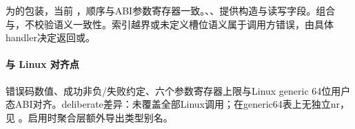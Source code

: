 为的包装，当前 ，顺序与ABI参数寄存器一致。、、提供构造与读写字段。组合与，不校验语义一致性。索引越界或未定义槽位语义属于调用方错误，由具体handler决定返回或。

\paragraph{与 Linux 对齐点}

错误码数值、成功非负/失败约定、六个参数寄存器上限与Linux generic 64位用户态ABI对齐。deliberate差异：未覆盖全部Linux调用；在generic64表上无独立nr，见 。启用时聚合层额外导出类型别名。
